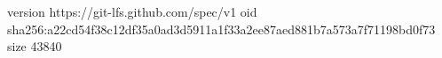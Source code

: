 version https://git-lfs.github.com/spec/v1
oid sha256:a22cd54f38c12df35a0ad3d5911a1f33a2ee87aed881b7a573a7f71198bd0f73
size 43840
